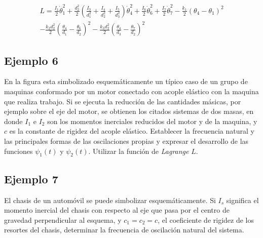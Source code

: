 \begin{equation*}
\begin{split}
    L=\frac{I_1}{2}\dot{\theta}_1^2+
      \frac{d_2^2}{2}\left(
        \frac{I_3}{d_1^2}+\frac{I_4}{d_2^2}+\frac{I_5}{d_3^2}
      \right)\dot{\theta}_4^2+
      \frac{I_6}{2}\dot{\theta}_6^2+
      \frac{I_7}{2}\dot{\theta}_7^2-
      \frac{k_1}{2}{(\theta_4-\theta_1)}^2\\
      -\frac{k_2 d_2^2}{2}{\left(
        \frac{\theta_4}{d_1}-\frac{\theta_6}{d_2}
      \right)}^2-
      \frac{k_3 d_2^2}{2}{\left(
        \frac{\theta_4}{d_3}-\frac{\theta_7}{d_2}
      \right)}^2
\end{split}
\end{equation*}

\subsection{Ejemplo 6}
En la figura esta simbolizado esquemáticamente un típico caso de un grupo de
maquinas conformado por un motor conectado con acople elástico con la maquina
que realiza trabajo. Si se ejecuta la reducción de las cantidades másicas, por
ejemplo sobre el eje del motor, se obtienen los citados sistemas de dos masas,
en donde $I_1$ e $I_2$ son los momentos inerciales reducidos del motor y de la
maquina, y $c$ es la constante de rigidez del acople elástico. Establecer la
frecuencia natural y las principales formas de las oscilaciones propias y
expresar el desarrollo de las funciones $\psi_1(t)$ y $\psi_2(t)$. Utilizar la
función de \emph{Lagrange} $L$.

\subsection{Ejemplo 7}
El chasis de un automóvil se puede simbolizar esquemáticamente. Si $I_s$
significa el momento inercial del chasis con respecto al eje que pasa por el
centro de gravedad perpendicular al esquema, y $c_1=c_2=c$, el coeficiente de
rigidez de los resortes del chasis, determinar la frecuencia de oscilación
natural del sistema.

